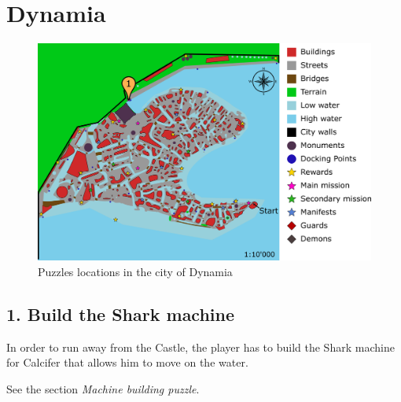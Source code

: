 {\let\clearpage\relax\section{Dynamia}}

\begin{figure}[H]
  \centering
  \includegraphics[width=\textwidth]{Images/Maps/dynamiaPuzzles}
  \caption{Puzzles locations in the city of Dynamia}
\end{figure}

\subsection{1. Build the Shark machine}

In order to run away from the Castle, the player has to build the Shark machine for Calcifer that allows him to move on the water.

See the section \textit{Machine building puzzle}.
